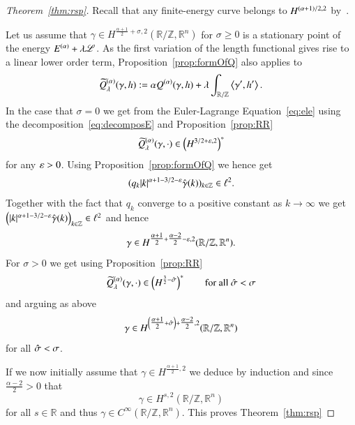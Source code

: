 \begin{proof}[Theorem~\ref{thm:rsp}]
 Recall that any finite-energy curve belongs to $\W[(\a+1)/2,2]$ by~\cite{blatt:bre}.
 
 Let us assume that $\gamma \in H^{\frac {\alpha + 1} 2 + \sigma,2} (\mathbb R / \mathbb Z, \mathbb R^n)$
 for $\sigma \geq 0$ is a stationary point of the energy $\E + \lambda\length$.
 As the first variation of the length functional gives rise to a linear lower order term,
 Proposition~\ref{prop:formOfQ} also applies to
 \[ \tQ(\g,h) := \a\Q(\g,h)+\lambda\int_{\R/\Z}\sp{\dg,\dh}. \]
 In the case that $\sigma=0$ we get from the Euler-Lagrange Equation~\eqref{eq:ele} using the decomposition~\eqref{eq:decomposE} and Proposition~\ref{prop:RR} 
 \begin{equation*}
  \tQ( \gamma, \cdot)
  \in \left( H^{{3}/2+\eps,2} \right)^{\ast}
 \end{equation*}
 for any $\eps>0$.
 Using Proposition~\ref{prop:formOfQ} we hence get
 \begin{equation*}
   (q_k |k|^{\alpha+1-3/2-\eps} \hat \gamma (k))_{k\in \mathbb Z} \in \ell^2.
 \end{equation*}
 Together with the fact that $q_k$ converge to a positive constant as $k \rightarrow \infty$
 we get $ \left(|k|^{\alpha+1-3/2-\eps} \hat \gamma (k)\right)_{k \in \mathbb Z} \in \ell^2$
 and hence
  \begin{equation*}
    \gamma \in H^{\tfrac {\alpha +1 } 2 + \tfrac {\alpha -2 } 2 -\eps,2}
    (\mathbb R / \mathbb Z, \mathbb R^n).
  \end{equation*}
 For $\sigma >0$ we get using Proposition~\ref{prop:RR} 
 \begin{equation*}
  \tQ( \gamma, \cdot)
  \in \left( H^{\frac {3}2 - \hat \sigma } \right)^*\qquad\text{for all }\hat\sigma<\sigma
 \end{equation*} 
and arguing as above
\begin{equation*}
 \gamma \in H^{\br{\tfrac {\alpha +1 } 2 + \hat \s}+ \tfrac {\alpha -2 } 2,2}
  (\mathbb R / \mathbb Z, \mathbb R^n)
\end{equation*}
for all $\hat \s < \sigma$.

If we now initially assume that $\gamma \in H^{\frac {\alpha +1} 2 ,2}$ we deduce by induction
and since $\tfrac {\alpha-2} 2 >0$ that
 \begin{equation*}
  \gamma \in H^{s,2}(\mathbb R / \mathbb Z, \mathbb R^n)
 \end{equation*}
for all $s \in \mathbb R$ and thus $\gamma \in C^{\infty}(\mathbb R / \mathbb Z, \mathbb R^n)$.
This proves Theorem~\ref{thm:rsp}
\end{proof}